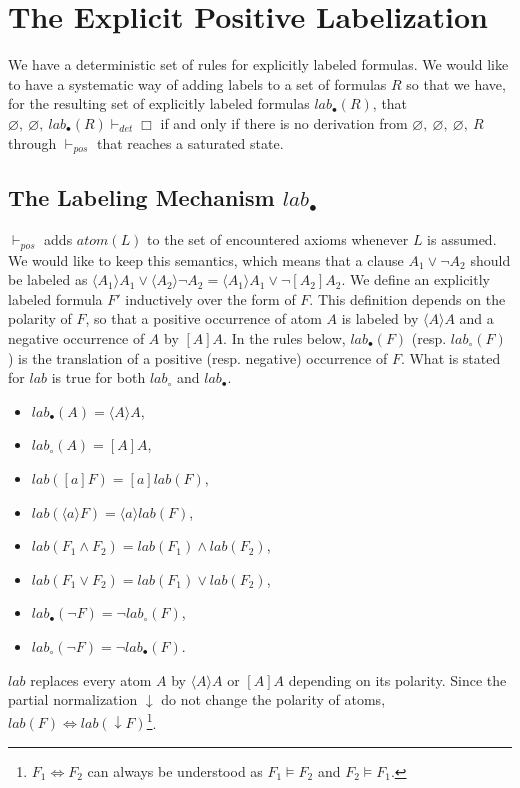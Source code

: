 \documentclass[a4paper,10pt]{report}
\newcommand{\atom}{\mathit{atom}}
\newcommand{\pos}{\vdash_\mathit{pos}}
\newcommand{\dett}{\vdash_\mathit{det}}
\newcommand{\T}{\mathit{lab}}
\begin{document}
\section{The Explicit Positive Labelization}
We have a deterministic set of rules for explicitly labeled formulas. We would like to have a 
systematic way of adding labels to a set of formulas $R$ so that we have, for the resulting set of
explicitly labeled formulas $\T_\bullet(R)$, that
$\varnothing,\ \varnothing,\ \T_\bullet(R)\dett\Box$ if and only if
there is no derivation from $\varnothing,\ \varnothing,\ \varnothing,\ R$ through $\pos$ that reaches
a saturated state.

\subsection{The Labeling Mechanism $\T_\bullet$}
$\pos$ adds $\atom(L)$ to the set of encountered axioms whenever $L$ is assumed. We would like to
keep this semantics, which means that a clause $A_1\vee\neg A_2$ should be labeled as
$\langle A_1\rangle A_1\vee\langle A_2\rangle\neg A_2=\langle A_1\rangle A_1\vee\neg [A_2]A_2$.
We define an explicitly labeled formula $F'$ inductively over the form of $F$. This definition
depends on the polarity of $F$, so that a positive occurrence of atom $A$ is labeled by
$\langle A\rangle A$ and a negative occurrence of $A$ by $[A]A$. In the rules below,
$\T_\bullet(F)$ (resp. $\T_\circ(F)$) is the translation of a positive (resp.
negative) occurrence of $F$. What is stated for $\T$ is true for both $\T_\circ$ and $\T_\bullet$.
\begin{itemize}
 \item $\T_\bullet(A)=\langle A\rangle A$,
 \item $\T_\circ(A)=[A]A$,
 \item $\T([a]F)=[a]\T(F)$,
 \item $\T(\langle a\rangle F)=\langle a\rangle\T(F)$,
 \item $\T(F_1\wedge F_2)=\T(F_1)\wedge\T(F_2)$,
 \item $\T(F_1\vee F_2)=\T(F_1)\vee\T(F_2)$,
 \item $\T_\bullet(\neg F)= \neg\T_\circ(F)$,
 \item $\T_\circ(\neg F)= \neg\T_\bullet(F)$.
\end{itemize}
$\T$ replaces every atom $A$ by $\langle A\rangle A$ or $[A]A$ depending on its polarity. Since
the partial normalization $\downarrow$ do not change the polarity of atoms,
$\T(F)\Leftrightarrow\T(\downarrow F)$\footnote{$F_1\Leftrightarrow F_2$ can always be understood as
$F_1\vDash F_2$ and $F_2\vDash F_1$.}.
\end{document}
